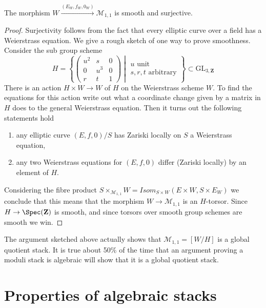 \begin{lemma}
\label{lemma-Weierstrass-smooth-cover}
The morphism $W \xrightarrow{(E_W, f_W, 0_W)} \mathcal{M}_{1, 1}$ is smooth
and surjective.
\end{lemma}

\begin{proof}
Surjectivity follows from the fact that every elliptic curve over a
field has a Weierstrass equation. We give a rough sketch of one
way to prove smoothness. Consider the sub group scheme
$$
H =
\left\{
\left(
\begin{matrix}
u^2 & s & 0 \\
0 & u^3 & 0 \\
r & t & 1
\end{matrix}
\right)
\middle|
\begin{matrix}
u\text{ unit} \\
s, r, t\text{ arbitrary}
\end{matrix}
\right\}
\subset
\text{GL}_{3, \mathbf{Z}}
$$
There is an action $H \times W \to W$ of $H$ on the Weierstrass scheme $W$.
To find the equations for this action write out what a coordinate change
given by a matrix in $H$ does to the general Weierstrass equation.
Then it turns out the following statements hold
\begin{enumerate}
\item any elliptic curve $(E, f, 0)/S$ has Zariski locally on $S$
a Weierstrass equation,
\item any two Weierstrass equations for $(E, f, 0)$ differ (Zariski locally)
by an element of $H$.
\end{enumerate}
Considering the fibre product
$S \times_{\mathcal{M}_{1, 1}} W =
\mathit{Isom}_{S \times W}(E \times W, S \times E_W)$
we conclude that this means that the morphism
$W \to \mathcal{M}_{1, 1}$ is an $H$-torsor.
Since $H \to \Spec(\mathbf{Z})$ is smooth, and since torsors
over smooth group schemes are smooth we win.
\end{proof}

\begin{remark}
\label{remark-quotient-stack}
The argument sketched above actually shows that
$\mathcal{M}_{1, 1} = [W/H]$ is a global quotient stack.
It is true about 50\% of the time that an argument proving a moduli
stack is algebraic will show that it is a global quotient stack.
\end{remark}



\section{Properties of algebraic stacks}
\label{section-properties}

